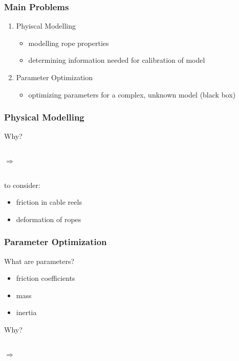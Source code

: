 \begin{frame}[c]
	\frametitle{Main Problems}
	\begin{enumerate}
		\item{Phyiscal Modelling}
			\begin{itemize}
				\item{modelling rope properties}
				\item{determining information needed for calibration of model}
			\end{itemize}
		\vspace{0.5cm}
		\item{Parameter Optimization}
			\begin{itemize}
				\item{optimizing parameters for a complex, unknown model (black box)}
			\end{itemize}
	\end{enumerate}
\end{frame}

\begin{frame}[c]
	\frametitle{Physical Modelling}
	Why?
	
	\vspace{0.5cm}
	
	\begin{columns}[t]
			\centering
			\centering
			$\Rightarrow$
			\centering
	\end{columns}
	
	\vspace{0.5cm}
	
	to consider:
	\begin{itemize}
		\item{friction in cable reels}
		\item{deformation of ropes}
	\end{itemize}
\end{frame}

\begin{frame}[c]
	\frametitle{Parameter Optimization}
	What are parameters?
	\begin{itemize}
		\item{friction coefficients}
		\item{mass}
		\item{inertia}
	\end{itemize}
	
	\vspace{0.5cm}
	
	Why?
	
	\vspace{0.5cm}
	
	\begin{columns}
			\centering
			\centering
			$\Rightarrow$
	\end{columns}
\end{frame}


